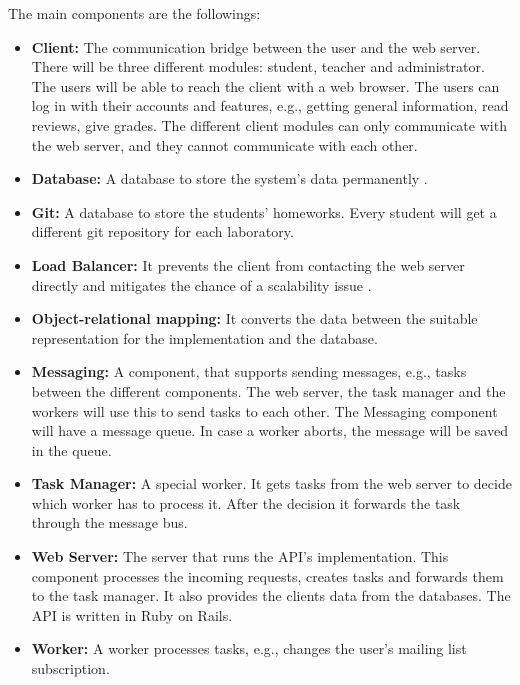 The main components are the followings:

\begin{itemize}
	\item \textbf{Client:} The communication bridge between the user and the web server. There will be three different modules: student, teacher and administrator. The users will be able to reach the client with a web browser. The users can log in with their accounts and features, e.g., getting general information, read reviews, give grades. The different client modules can only communicate with the web server, and they cannot communicate with each other. 
	\item \textbf{Database:} A database to store the system's data permanently . 
	\item \textbf{Git:} A database to store the students' homeworks. Every student will get a different git repository for each laboratory.
	\item \textbf{Load Balancer:} It prevents the client from contacting the web server directly and mitigates the chance of a scalability issue . 
	\item \textbf{Object-relational mapping:} It converts the data between the suitable representation for the implementation and the database. 
	\item \textbf{Messaging:} A component, that supports sending messages, e.g., tasks between the different components. The web server, the task manager and the workers will use this to send tasks to each other. The Messaging component will have a message queue. In case a worker aborts, the message will be saved in the queue.
	\item \textbf{Task Manager:} A special worker. It gets tasks from the web server to decide which worker has to process it. After the decision it forwards the task through the message bus.
	\item \textbf{Web Server:} The server that runs the API's implementation. This component processes the incoming requests, creates tasks and forwards them to the task manager. It also provides the clients data from the databases. The API is written in Ruby on Rails. 
	\item \textbf{Worker:} A worker processes tasks, e.g., changes the user's mailing list subscription.
\end{itemize}

